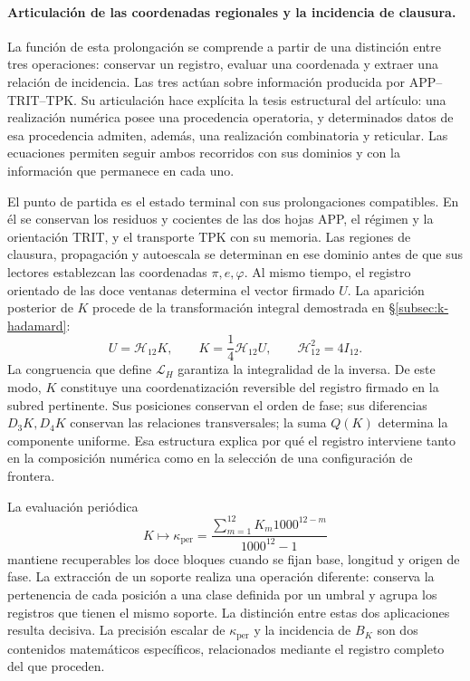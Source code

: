 \paragraph{Articulación de las coordenadas regionales y la incidencia de clausura.}
\label{inc-ampl-articulacion}
La función de esta prolongación se comprende a partir de una distinción
entre tres operaciones: conservar un registro, evaluar una coordenada y
extraer una relación de incidencia. Las tres actúan sobre información
producida por APP--TRIT--TPK. Su articulación hace explícita la tesis
estructural del artículo: una realización numérica posee una procedencia
operatoria, y determinados datos de esa procedencia admiten, además, una
realización combinatoria y reticular. Las ecuaciones permiten seguir ambos
recorridos con sus dominios y con la información que permanece en cada uno.

El punto de partida es el estado terminal con sus prolongaciones
compatibles. En él se conservan los residuos y cocientes de las dos hojas
APP, el régimen y la orientación TRIT, y el transporte TPK con su memoria.
Las regiones de clausura, propagación y autoescala se determinan en ese
dominio antes de que sus lectores establezcan las coordenadas
$\pi,e,\varphi$. Al mismo tiempo, el registro orientado de las doce
ventanas determina el vector firmado $U$. La aparición posterior de $K$
procede de la transformación integral demostrada en
\S\ref{subsec:k-hadamard}:
\begin{equation}
 U=\mathcal H_{12}K,\qquad
 K=\frac14\mathcal H_{12}U,\qquad
 \mathcal H_{12}^{2}=4I_{12}.
 \label{inc-ampl-registro}
\end{equation}
La congruencia que define $\mathcal L_H$ garantiza la integralidad de
la inversa. De este modo, $K$ constituye una coordenatización reversible
del registro firmado en la subred pertinente. Sus posiciones conservan el
orden de fase; sus diferencias $D_3K,D_4K$ conservan las relaciones
transversales; la suma $Q(K)$ determina la componente uniforme. Esa
estructura explica por qué el registro interviene tanto en la composición
numérica como en la selección de una configuración de frontera.

La evaluación periódica
\[
 K\longmapsto\kappa_{\mathrm{per}}
 =\frac{\sum_{m=1}^{12}K_m1000^{12-m}}{1000^{12}-1}
\]
mantiene recuperables los doce bloques cuando se fijan base, longitud y
origen de fase. La extracción de un soporte realiza una operación
diferente: conserva la pertenencia de cada posición a una clase definida
por un umbral y agrupa los registros que tienen el mismo soporte. La
distinción entre estas dos aplicaciones resulta decisiva. La precisión
escalar de $\kappa_{\mathrm{per}}$ y la incidencia de $B_K$ son dos
contenidos matemáticos específicos, relacionados mediante el registro
completo del que proceden.

